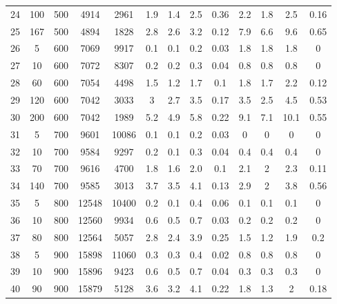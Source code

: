 \documentclass[11pt]{article}
\begin{document}
\begin{appendices}
\begin{landscape}
\begin{longtable}[c]{ccccc|cccc|cccc}
				\rowcolor[HTML]{EFEFEF} 
				24 & 100 & 500 & 4914 & 2961 & 1.9 & 1.4 & 2.5 & 0.36 & 2.2 & 1.8 & 2.5 & 0.16 \\
				\rowcolor[HTML]{EFEFEF} 
				25 & 167 & 500 & 4894 & 1828 & 2.8 & 2.6 & 3.2 & 0.12 & 7.9 & 6.6 & 9.6 & 0.65 \\
				26 & 5 & 600 & 7069 & 9917 & 0.1 & 0.1 & 0.2 & 0.03 & 1.8 & 1.8 & 1.8 & 0 \\
				27 & 10 & 600 & 7072 & 8307 & 0.2 & 0.2 & 0.3 & 0.04 & 0.8 & 0.8 & 0.8 & 0 \\
				28 & 60 & 600 & 7054 & 4498 & 1.5 & 1.2 & 1.7 & 0.1 & 1.8 & 1.7 & 2.2 & 0.12 \\
				29 & 120 & 600 & 7042 & 3033 & 3 & 2.7 & 3.5 & 0.17 & 3.5 & 2.5 & 4.5 & 0.53 \\
				30 & 200 & 600 & 7042 & 1989 & 5.2 & 4.9 & 5.8 & 0.22 & 9.1 & 7.1 & 10.1 & 0.55 \\
				\rowcolor[HTML]{EFEFEF} 
				31 & 5 & 700 & 9601 & 10086 & 0.1 & 0.1 & 0.2 & 0.03 & 0 & 0 & 0 & 0 \\
				\rowcolor[HTML]{EFEFEF} 
				32 & 10 & 700 & 9584 & 9297 & 0.2 & 0.1 & 0.3 & 0.04 & 0.4 & 0.4 & 0.4 & 0 \\
				\rowcolor[HTML]{EFEFEF} 
				33 & 70 & 700 & 9616 & 4700 & 1.8 & 1.6 & 2.0 & 0.1 & 2.1 & 2 & 2.3 & 0.11 \\
				\rowcolor[HTML]{EFEFEF} 
				34 & 140 & 700 & 9585 & 3013 & 3.7 & 3.5 & 4.1 & 0.13 & 2.9 & 2 & 3.8 & 0.56 \\
				35 & 5 & 800 & 12548 & 10400 & 0.2 & 0.1 & 0.4 & 0.06 & 0.1 & 0.1 & 0.1 & 0 \\
				36 & 10 & 800 & 12560 & 9934 & 0.6 & 0.5 & 0.7 & 0.03 & 0.2 & 0.2 & 0.2 & 0 \\
				37 & 80 & 800 & 12564 & 5057 & 2.8 & 2.4 & 3.9 & 0.25 & 1.5 & 1.2 & 1.9 & 0.2 \\
				\rowcolor[HTML]{EFEFEF} 
				38 & 5 & 900 & 15898 & 11060 & 0.3 & 0.3 & 0.4 & 0.02 & 0.8 & 0.8 & 0.8 & 0 \\
				\rowcolor[HTML]{EFEFEF} 
				39 & 10 & 900 & 15896 & 9423 & 0.6 & 0.5 & 0.7 & 0.04 & 0.3 & 0.3 & 0.3 & 0 \\
				\rowcolor[HTML]{EFEFEF} 
				40 & 90 & 900 & 15879 & 5128 & 3.6 & 3.2 & 4.1 & 0.22 & 1.8 & 1.3 & 2 & 0.18
			\end{longtable}
		\end{landscape}
		

\end{appendices}
\end{document}
